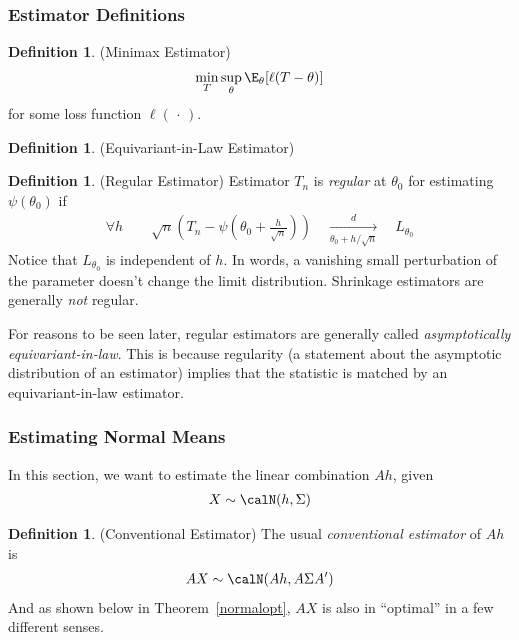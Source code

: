 \documentclass[12pt]{article}
\theoremstyle{plain}
\theoremstyle{definition}
\newtheorem{defn}[thm]{Definition}
\theoremstyle{remark}
\newcommand{\dto}{\xrightarrow{d}}
\begin{document}
\subsubsection{Estimator Definitions}

\begin{defn}
(Minimax Estimator)
\begin{align*}
  \min_T
  \sup_\theta
  \E_\theta[\ell(T-\theta)]
\end{align*}
for some loss function $\ell(\,\cdot\,)$.
\end{defn}


\begin{defn}
(Equivariant-in-Law Estimator)
\end{defn}

\begin{defn}(Regular Estimator)
Estimator $T_n$ is \emph{regular} at $\theta_0$ for
estimating $\psi(\theta_0)$ if
\begin{align*}
  \forall h
  \qquad
  \sqrt{n}
  \left(
  T_n
  -
  \psi\left(
  \theta_0 + \frac{h}{\sqrt{n}}
  \right)
  \right)
  \quad\underset{\theta_0+h/\sqrt{n}}{\dto}\quad
  L_{\theta_0}
\end{align*}
Notice that $L_{\theta_0}$ is independent of $h$.
In words, a vanishing small perturbation of the parameter doesn't change
the limit distribution.
Shrinkage estimators are generally \emph{not} regular.

For reasons to be seen later, regular estimators are generally called
\emph{asymptotically equivariant-in-law}.
This is because regularity (a statement about the asymptotic
distribution of an estimator) implies that the statistic is matched by
an equivariant-in-law estimator.
\end{defn}

\subsubsection{Estimating Normal Means}

In this section, we want to estimate the linear combination $Ah$, given
\begin{align}
  X \sim \calN(h,\Sigma)
  \label{limitobs}
\end{align}

\begin{defn}(Conventional Estimator)
The usual \emph{conventional estimator} of $Ah$ is
\begin{align*}
  AX
  \sim \calN(Ah, A\Sigma A')
\end{align*}
And as shown below in Theorem~\ref{normalopt}, $AX$ is also in
``optimal'' in a few different senses.
\end{defn}
\end{document}
